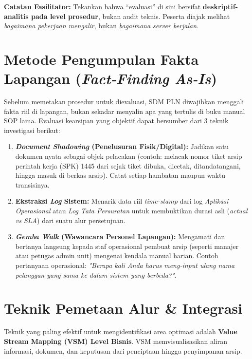 \documentclass[12pt,a4paper]{report}
\begin{document}
\begin{warnbox}
\textbf{Catatan Fasilitator:} Tekankan bahwa ``evaluasi'' di sini bersifat \textbf{deskriptif-analitis pada level prosedur}, bukan audit teknis. Peserta diajak melihat \textit{bagaimana pekerjaan mengalir}, bukan \textit{bagaimana server berjalan}.
\end{warnbox}

\section{Metode Pengumpulan Fakta Lapangan (\textit{Fact-Finding As-Is})}
Sebelum memetakan prosedur untuk dievaluasi, SDM PLN diwajibkan menggali fakta riil di lapangan, bukan sekadar menyalin apa yang tertulis di buku manual SOP lama. Evaluasi kearsipan yang objektif dapat bersumber dari 3 teknik investigasi berikut:
\begin{enumerate}[leftmargin=*]
    \item \textbf{\textit{Document Shadowing} (Penelusuran Fisik/Digital):} Jadikan satu dokumen nyata sebagai objek pelacakan (contoh: melacak nomor tiket arsip perintah kerja (SPK) 1445 dari sejak tiket dibuka, dicetak, ditandatangani, hingga masuk di berkas arsip). Catat setiap hambatan maupun waktu transisinya.
    \item \textbf{Ekstraksi \textit{Log} Sistem:} Menarik data riil \textit{time-stamp} dari log \textit{Aplikasi Operasional} atau \textit{Log Tata Persuratan} untuk membuktikan durasi asli (\textit{actual vs SLA}) dari suatu alur persetujuan.
    \item \textbf{\textit{Gemba Walk} (Wawancara Personel Lapangan):} Mengamati dan bertanya langsung kepada staf operasional pembuat arsip (seperti manajer atau petugas admin unit) mengenai kendala manual harian. Contoh pertanyaan operasional: \textit{"Berapa kali Anda harus meng-input ulang nama pelanggan yang sama ke dalam sistem yang berbeda?"}.
\end{enumerate}

\section{Teknik Pemetaan Alur \& Integrasi}
Teknik yang paling efektif untuk mengidentifikasi area optimasi adalah \textbf{Value Stream Mapping (VSM) Level Bisnis}. VSM memvisualisasikan aliran informasi, dokumen, dan keputusan dari penciptaan hingga penyimpanan arsip.
\end{document}
